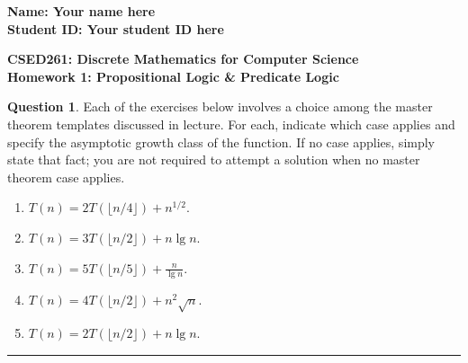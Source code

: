 \documentclass{article}%
\theoremstyle{definition}
\newtheorem{question}{Question}
\begin{document}
\begin{flushright}
\textbf{Name: Your name here\\
Student ID: Your student ID here}
\end{flushright}

\begin{center}
\textbf{CSED261: Discrete Mathematics for Computer Science \\
Homework 1: Propositional Logic \& Predicate Logic} \\
\end{center}

\begin{question}
Each of the exercises below involves a choice among the master theorem templates discussed in lecture.
For each, indicate which case applies and specify the asymptotic growth class of the function.  If no
case applies, simply state that fact; you are not required to attempt a solution when no master theorem case
applies.

\begin{enumerate}
\item $T(n) = 2 T(\lfloor n/4 \rfloor) + n^{1/2}$.
\item $T(n) = 3 T(\lfloor n/2 \rfloor) + n \lg n$.
\item $T(n) = 5 T(\lfloor n/5 \rfloor) + \frac{n}{\lg n}$.
\item $T(n) = 4 T(\lfloor n/2 \rfloor) + n^2 \sqrt{n}$.
\item $T(n) = 2 T(\lfloor n/2 \rfloor) + n \lg n$.
\end{enumerate}
\end{question}

\par\noindent\rule{\textwidth}{0.5pt}
\end{document}
